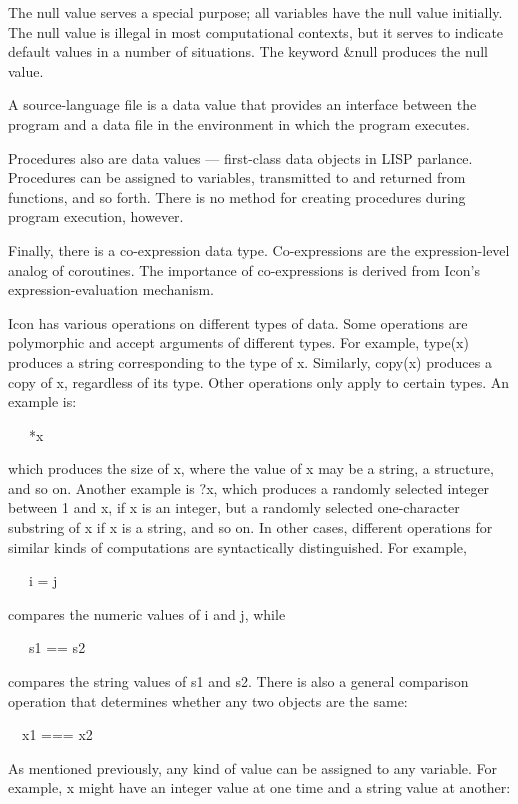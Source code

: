 The null value serves a special purpose; all variables have the null value initially. The null value is illegal in most
computational contexts, but it serves to indicate default values in a number of situations. The keyword \&null produces
the null value.

A source-language file is a data value that provides an interface
between the program and a data file in the environment in which the
program executes.

Procedures also are data values --- {\textquotedbl}first-class data
objects{\textquotedbl} in LISP parlance.  Procedures can be assigned
to variables, transmitted to and returned from functions, and so
forth. There is no method for creating procedures during program
execution, however.

Finally, there is a co-expression data type. Co-expressions are the
expression-level analog of coroutines. The importance of
co-expressions is derived from Icon's expression-evaluation mechanism.

Icon has various operations on different types of data. Some
operations are polymorphic and accept arguments of different
types. For example, type(x) produces a string corresponding to the
type of x. Similarly, copy(x) produces a copy of x, regardless of its
type. Other operations only apply to certain types. An example is:

{\ttfamily\mdseries
\ \ \ *x}


\noindent which produces the size of x, where the value of x may be a
string, a structure, and so on. Another example is ?x, which produces
a randomly selected integer between 1 and x, if x is an integer, but a
randomly selected one-character substring of x if x is a string, and
so on. In other cases, different operations for similar kinds of
computations are syntactically distinguished. For example,

{\ttfamily\mdseries
\ \ \ i = j}

\noindent compares the numeric values of i and j, while

{\ttfamily\mdseries
\ \ \ s1 == s2}


\noindent compares the string values of s1 and s2. There is also a
general comparison operation that determines whether any two objects
are the same:

{\ttfamily\mdseries
\ \ x1 === x2}

As mentioned previously, any kind of value can be assigned to any
variable. For example, x might have an integer value at one time and a
string value at another:

